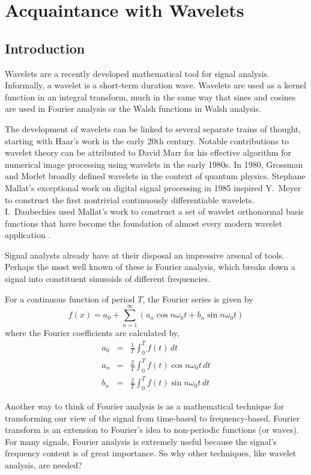 \documentclass[a4paper,11pt]{report}
\begin{document}
\chapter{Acquaintance with Wavelets}
\section{Introduction}
Wavelets are a recently developed mathematical tool for signal analysis. Informally, a wavelet is a short-term duration wave. Wavelets are used as a kernel function in an integral transform, much in the same way that sines and cosines are used in Fourier analysis or the Walsh functions in Walsh analysis. 

The development of wavelets can be linked to several separate trains of thought, starting with Haar's work in the early 20th century. Notable contributions to wavelet theory can be attributed to David Marr for his effective algorithm for numerical image processing using wavelets in the early 1980s. In 1980, Grossman and Morlet broadly defined wavelets in the context of quantum physics. Stephane Mallat's exceptional work on digital signal processing in 1985 inspired Y.~Meyer to construct the first nontrivial continuously differentiable wavelets. I.~Daubechies used Mallat's work to construct a set of wavelet orthonormal basis functions that have become the foundation of almost every modern wavelet application \cite{amara}.

Signal analysts already have at their disposal an impressive arsenal of tools. Perhaps the most well known of these is Fourier analysis, which breaks down a signal into constituent sinusoids of different frequencies. 

For a continuous function of period $T$, the Fourier series is given by
\begin{equation}
f(x) = a_{0} + \sum_{n=1}^{\infty} \left( a_{n} \cos n\omega_{0}t + b_{n} \sin n\omega_{0}t \right)
\end{equation}
where the Fourier coefficients are calculated by,
\begin{eqnarray*}
a_{0} & = & \frac{1}{T} \int_{0}^{T} f(t)\,dt \\
a_{n} & = & \frac{2}{T} \int_{0}^{T} f(t) \cos n\omega_{0}t\,dt \\
b_{n} & = & \frac{2}{T} \int_{0}^{T} f(t) \sin n\omega_{0}t\,dt
\end{eqnarray*}

Another way to think of Fourier analysis is as a mathematical technique for transforming our view of the signal from time-based to frequency-based. Fourier transform is an extension to Fourier's idea to non-periodic functions (or waves). For many signals, Fourier analysis is extremely useful because the signal's frequency content is of great importance. So why other techniques, like wavelet analysis, are needed?
         
\end{document}
